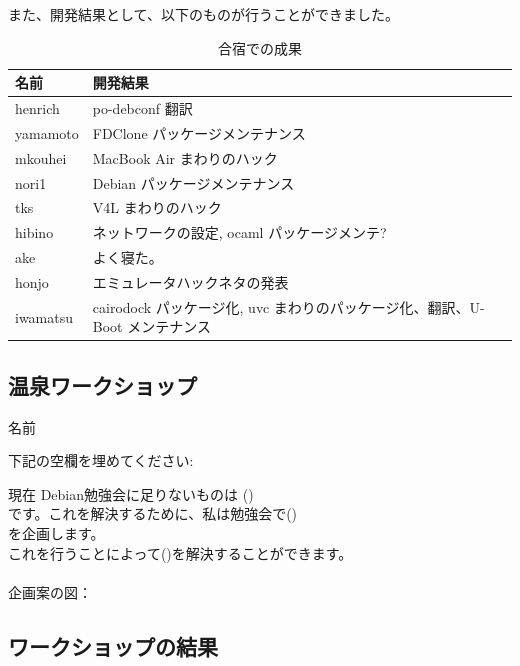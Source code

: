 \documentclass[mingoth,a4paper]{jsarticle}
\begin{document}
また、開発結果として、以下のものが行うことができました。

\begin{table}[h]
 \begin{center}
 {
   \begin{tabular}{l|l} \hline
     名前 & 開発結果  \\ \hline \hline
     henrich & po-debconf 翻訳 \\
     yamamoto & FDClone パッケージメンテナンス \\
     mkouhei & MacBook Air まわりのハック \\
     nori1 & Debian パッケージメンテナンス \\
     tks & V4L まわりのハック \\
     hibino & ネットワークの設定, ocaml パッケージメンテ?\\
     ake & よく寝た。\\ 
     honjo & エミュレータハックネタの発表 \\
     iwamatsu & cairodock パッケージ化, uvc まわりのパッケージ化、翻訳、U-Boot メンテナンス \\
   \end{tabular}
 }
 \caption{合宿での成果}
 \label{gassyuku-output}
 \end{center}
\end{table}

\subsection{温泉ワークショップ}{}
\hfill{}{\large 名前} \underline{\hspace{6cm}}

下記の空欄を埋めてください:

{\LARGE 
現在 Debian勉強会に足りないものは (\hspace{6cm})\\
です。これを解決するために、私は勉強会で(\hspace{6cm})\\
を企画します。\\
これを行うことによって(\hspace{6cm})を解決することができます。
}
\\\\
企画案の図：

\newpage

\subsection{ワークショップの結果}
\end{document}
